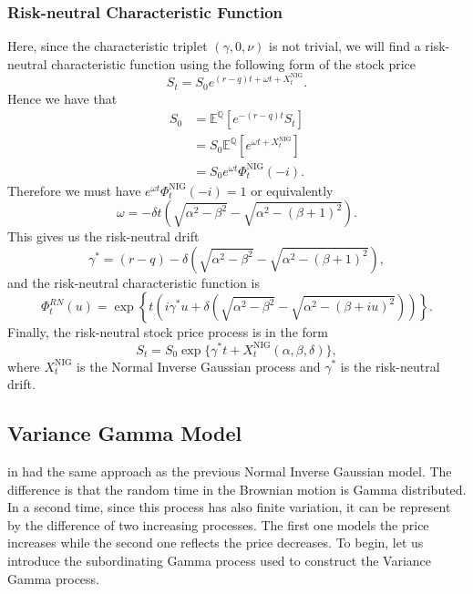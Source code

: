 \subsubsection*{Risk-neutral Characteristic Function}
Here, since the characteristic triplet $(\gamma,0,\nu)$ is not trivial, we will find a risk-neutral characteristic function using the following form of the stock price
$$S_t=S_0 e^{(r-q)t+\omega t +X_t^\text{NIG}}.$$
Hence we have that
\begin{align*}
S_0&=\mathbb{E}^\mathbb{Q}\left[e^{-(r-q)t}S_t\right]\\
&=S_0\mathbb{E}^\mathbb{Q}\left[e^{\omega t + X^\text{NIG}_t}\right]\\
&=S_0e^{\omega t}\Phi_t^\text{NIG}(-i).
\end{align*}
Therefore we must have $e^{\omega t}\Phi^\text{NIG}_t(-i) = 1$ or equivalently
$$\omega = - \delta t\left(\sqrt{\alpha^2-\beta^2}-\sqrt{\alpha^2-(\beta+1)^2}\right).$$
This gives us the risk-neutral drift
$$\gamma^\ast=(r-q) -\delta \left(\sqrt{\alpha^2-\beta^2}-\sqrt{\alpha^2-(\beta+1)^2}\right),$$
and the risk-neutral characteristic function is
$$\Phi^{RN}_t(u) = \exp\left\{t\left(i\gamma^\ast u + \delta \left(\sqrt{\alpha^2-\beta^2}-\sqrt{\alpha^2-(\beta+iu)^2}\right)\right)\right\}.$$
Finally, the risk-neutral stock price process is in the form
$$S_t = S_0 \exp\{\gamma^\ast t + X_t^\text{NIG} (\alpha,\beta,\delta)\},$$
where $X_t^\text{NIG}$ is the Normal Inverse Gaussian process and $\gamma^\ast$ is the risk-neutral drift.

\subsection{Variance Gamma Model}
\citeauthor{MCC98} in \citeyear{MCC98} had the same approach as the previous Normal Inverse Gaussian model. The difference is that the random time in the Brownian motion is Gamma distributed. In a second time, since this process has also finite variation, it can be represent by the difference of two increasing processes. The first one models the price increases while the second one reflects the price decreases. To begin, let us introduce the subordinating Gamma process used to construct the Variance Gamma process.

